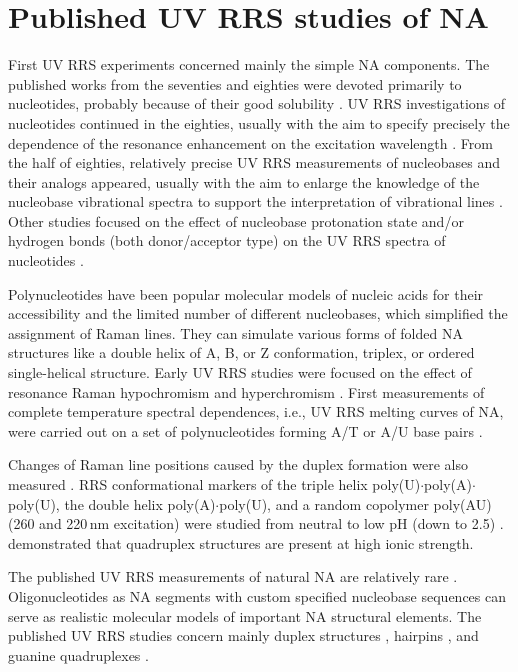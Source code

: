 \section{Published UV RRS studies of NA}

First UV RRS experiments concerned mainly the simple NA components.
The published works from the seventies and eighties were devoted primarily to
nucleotides, probably because of their good solubility
\parencite{Tsuboi1974}.
UV RRS investigations of nucleotides continued in the eighties, usually with
the aim to specify precisely the dependence of the resonance enhancement on the
excitation wavelength
\parencite{Ziegler1984}.
From the half of eighties, relatively precise UV RRS measurements of
nucleobases and their analogs appeared, usually with the aim to enlarge the
knowledge of the nucleobase vibrational spectra to support the interpretation
of vibrational lines
\parencite{Ghomi1986}.
Other studies focused on the effect of nucleobase protonation state and/or
hydrogen bonds (both donor/acceptor type) on the UV RRS spectra of nucleotides
\parencite{Gfrorer1991}.

Polynucleotides have been popular molecular models of nucleic acids for their
accessibility and the limited number of different nucleobases, which simplified
the assignment of Raman lines.
They can simulate various forms of folded NA structures like a double
helix of A, B, or Z conformation, triplex, or ordered single-helical structure.
Early UV RRS studies were focused on the effect of resonance Raman
hypochromism
\parencite{Pezolet1975}
and hyperchromism
\parencite{Chinsky1980}.
First measurements of complete temperature spectral dependences, i.e., UV RRS
melting curves of NA, were carried out on a set of polynucleotides forming A/T
or A/U base pairs
\parencite{Jolles1985}.

Changes of Raman line positions caused by the duplex formation were also
measured
\parencite{Grygon1990}.
RRS conformational markers of the triple helix
poly(U)$\cdot$poly(A)$\cdot$poly(U), the double helix poly(A)$\cdot$poly(U),
and a random copolymer poly(AU) (260 and 220\,nm excitation) were studied from
neutral to low pH (down to 2.5)
\parencite{Gfrorer1993a}.
\textcite{Wheeler1996} demonstrated that quadruplex structures are present at
high ionic strength.

The published UV RRS measurements of natural NA are relatively rare
\parencite{%
	Laigle1982a,%
	Fodor1986a,%
	Wen1999,%
	Neugebauer2007,%
	Shaw2009%
}.
Oligonucleotides as NA segments with custom specified nucleobase sequences
can serve as realistic molecular models of important NA structural elements.
The published UV RRS studies concern mainly duplex structures
\parencite{Laigle1986},
hairpins
\parencite{Refregiers1997},
and guanine quadruplexes
\parencite{Mukerji1995}.

